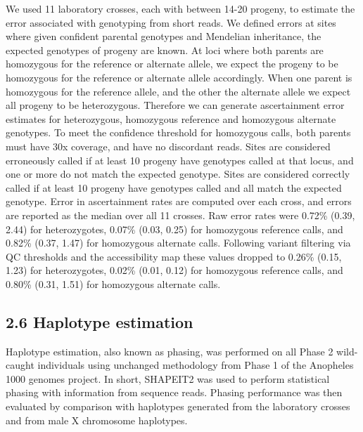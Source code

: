 \documentclass[a4paper,11pt,abstracton,hidelinks]{scrartcl}
\begin{document}
We used 11 laboratory crosses, each with between 14-20 progeny, to estimate the error associated with genotyping from short reads. 
%
We defined errors at sites where given confident parental genotypes and Mendelian inheritance, the expected genotypes of progeny are known. 
%
At loci where both parents are homozygous for the reference or alternate allele, we expect the progeny to be homozygous for the reference or alternate allele accordingly.
%
When one parent is homozygous for the reference allele, and the other the alternate allele we expect all progeny to be heterozygous. 
%
Therefore we can generate ascertainment error estimates for heterozygous, homozygous reference and homozygous alternate genotypes.
%
To meet the confidence threshold for homozygous calls, both parents must have 30x coverage, and have no discordant reads.
%
Sites are considered erroneously called if at least 10 progeny have genotypes called at that locus, and one or more do not match the expected genotype. 
%
Sites are considered correctly called if at least 10 progeny have genotypes called and all match the expected genotype. 
%
Error in ascertainment rates are computed over each cross, and errors are reported as the median over all 11 crosses. 
%
%
Raw error rates were 0.72\% (0.39, 2.44) for heterozygotes, 0.07\% (0.03, 0.25) for homozygous reference calls, and 0.82\% (0.37, 1.47) for homozygous alternate calls. 
%
Following variant filtering via QC thresholds and the accessibility map these values dropped to 0.26\% (0.15, 1.23) for heterozygotes, 0.02\% (0.01, 0.12) for homozygous reference calls, and 0.80\% (0.31, 1.51) for homozygous alternate calls. 



\subsection*{2.6 Haplotype estimation}

%
Haplotype estimation, also known as phasing, was performed on all Phase 2 wild-caught individuals using unchanged methodology from Phase 1 of the Anopheles 1000 genomes project\cite{Ag1000gConsortium2017}.
%
In short, SHAPEIT2 was used to perform statistical phasing with information from sequence reads.
%
Phasing performance was then evaluated by comparison with haplotypes generated from the laboratory crosses and from male X chromosome haplotypes.

\end{document}
